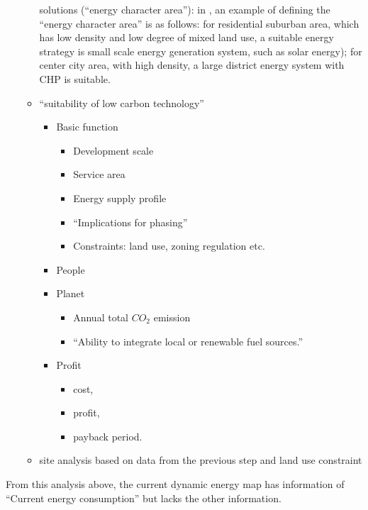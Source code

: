 \documentclass[hidelinks,12pt]{article}
\begin{document}
\begin{enumerate}[{Step }1]
\begin{itemize}
      solutions (``energy character area''\cite{IDEA2012}): in
      \cite{IDEA2012}, an example of defining the ``energy character
      area'' is as follows: for residential suburban area, which has
      low density and low degree of mixed land use, a suitable energy
      strategy is small scale energy generation system, such as solar
      energy); for center city area, with high density, a large
      district energy system with CHP is suitable.
    \item ``suitability of low carbon technology''~\cite{IDEA2012}
      \begin{itemize}
      \item Basic function
        \begin{itemize}
        \item Development scale
        \item Service area
        \item Energy supply profile
        \item ``Implications for phasing''~\cite{IDEA2012}
        \item Constraints: land use, zoning regulation etc.
        \end{itemize}
      \item People
      \item Planet
        \begin{itemize}
        \item Annual total $CO_2$ emission
        \item ``Ability to integrate local or renewable fuel
          sources.''~\cite{IDEA2012}
        \end{itemize}
      \item Profit
        \begin{itemize}
        \item cost, 
        \item profit,
        \item payback period.
        \end{itemize}
      \end{itemize}
    \item site analysis based on data from the previous step and land
      use constraint
    \end{itemize}
\end{enumerate}

From this analysis above, the current dynamic energy map has
information of ``Current energy consumption'' but lacks the other
information.
\end{document}
